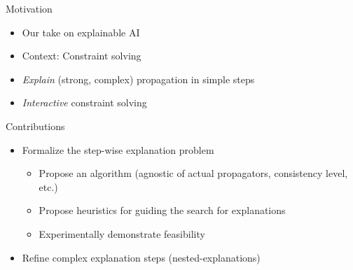 \documentclass{beamer}
\begin{document}
\begin{frame}{\small{Motivation}}



    \begin{itemize}
        \item Our take on explainable AI
        \item Context: Constraint solving
        \item \emph{Explain} (strong, complex) propagation in simple steps
        \item \emph{Interactive} constraint solving
    \end{itemize}

\end{frame}










\begin{frame}{\small{Contributions}}

    \begin{itemize}
        \item Formalize the step-wise explanation problem %
              \begin{itemize}
                  \item Propose an algorithm (agnostic of actual propagators, consistency level, etc.)
                  \item Propose heuristics for guiding the search for explanations
                  \item Experimentally demonstrate feasibility
              \end{itemize}
        \item Refine complex explanation steps (nested-explanations)%

    \end{itemize}

\end{frame}
\end{document}
